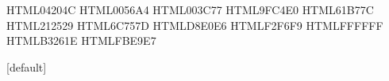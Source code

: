 %
%      
%

\makeatletter

\usepackage[T1]{fontenc}
\usepackage[sfdefault,scale=1.0]{plex-sans}   %
\usepackage[scale=0.92]{plex-mono}            %
\usepackage{microtype}
\usepackage{xcolor}
\usepackage{tikz}
\usepackage{tcolorbox}
\usepackage{appendixnumberbeamer}
\usepackage{booktabs}
\usepackage{colortbl}
\usepackage{array}
\usepackage{amssymb}
\usepackage{etoolbox}
\usepackage{graphicx}
 
\usetikzlibrary{calc, fadings, shadows.blur}

\definecolor{dgNavy}   {HTML}{04204C}   %
\definecolor{dgBlue}   {HTML}{0056A4}   %
\definecolor{dgBlueDk} {HTML}{003C77}
\definecolor{dgBlueLt} {HTML}{9FC4E0}   %
\definecolor{dgGreen}  {HTML}{61B77C}   %
\definecolor{dgInk}    {HTML}{212529}   %
\definecolor{dgMuted}  {HTML}{6C757D}   %
\definecolor{dgRule}   {HTML}{D8E0E6}   %
\definecolor{dgWash}   {HTML}{F2F6F9}   %
\definecolor{dgGround} {HTML}{FFFFFF}
\definecolor{dgAlert}   {HTML}{B3261E}   %
\definecolor{dgAlertBg} {HTML}{FBE9E7}   %


[default]      %

